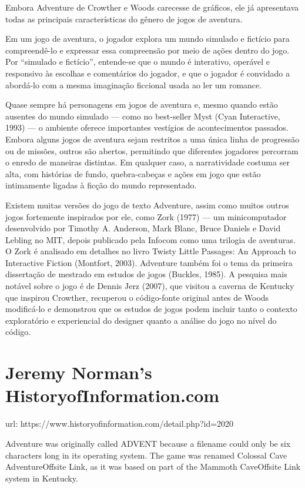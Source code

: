 \documentclass[12pt,a4paper]{article}
\begin{document}
Embora Adventure de Crowther e Woods carecesse de gráficos, ele já apresentava todas as principais características do gênero de jogos de aventura.

Em um jogo de aventura, o jogador explora um mundo simulado e fictício para compreendê-lo e expressar essa compreensão por meio de ações dentro do jogo.
Por “simulado e fictício”, entende-se que o mundo é interativo, operável e responsivo às escolhas e comentários do jogador, e que o jogador é convidado a abordá-lo com a mesma imaginação ficcional usada ao ler um romance.

Quase sempre há personagens em jogos de aventura e, mesmo quando estão ausentes do mundo simulado — como no best-seller Myst (Cyan Interactive, 1993) — o ambiente oferece importantes vestígios de acontecimentos passados.
Embora alguns jogos de aventura sejam restritos a uma única linha de progressão ou de missões, outros são abertos, permitindo que diferentes jogadores percorram o enredo de maneiras distintas. Em qualquer caso, a narratividade costuma ser alta, com histórias de fundo, quebra-cabeças e ações em jogo que estão intimamente ligadas à ficção do mundo representado.

Existem muitas versões do jogo de texto Adventure, assim como muitos outros jogos fortemente inspirados por ele, como Zork (1977) — um minicomputador desenvolvido por Timothy A. Anderson, Mark Blanc, Bruce Daniels e David Lebling no MIT, depois publicado pela Infocom como uma trilogia de aventuras.
O Zork é analisado em detalhes no livro Twisty Little Passages: An Approach to Interactive Fiction (Montfort, 2003).
Adventure também foi o tema da primeira dissertação de mestrado em estudos de jogos (Buckles, 1985).
A pesquisa mais notável sobre o jogo é de Dennis Jerz (2007), que visitou a caverna de Kentucky que inspirou Crowther, recuperou o código-fonte original antes de Woods modificá-lo e demonstrou que os estudos de jogos podem incluir tanto o contexto exploratório e experiencial do designer quanto a análise do jogo no nível do código.

\section{Jeremy Norman’s HistoryofInformation.com}

url: https://www.historyofinformation.com/detail.php?id=2020

Adventure was originally called ADVENT because a filename could only be six characters long in its operating system.  The game was renamed Colossal Cave AdventureOffsite Link, as it was based on part of the Mammoth CaveOffsite Link system in Kentucky.
\end{document}
